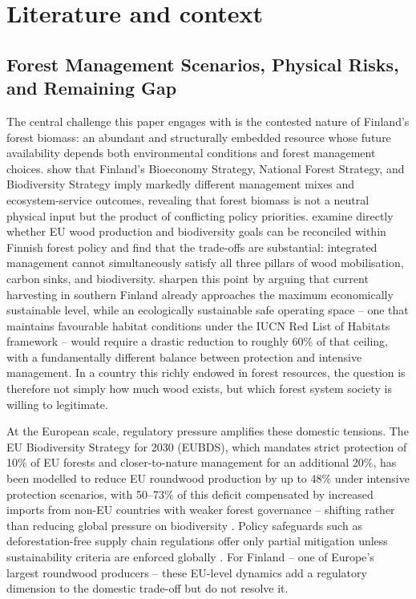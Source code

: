 \documentclass{article}
\begin{document}
\section{Literature and context}
\label{sec:lit_context}

\subsection{Forest Management Scenarios, Physical Risks, and Remaining Gap}

The central challenge this paper engages with is the contested nature of Finland's forest biomass: an abundant and structurally embedded resource whose future availability depends both environmental conditions and forest management choices. \citet{blattertSectoralPoliciesCause2022} show that Finland's Bioeconomy Strategy, National Forest Strategy, and Biodiversity Strategy imply markedly different management mixes and ecosystem-service outcomes, revealing that forest biomass is not a neutral physical input but the product of conflicting policy priorities. \citet{ratyEUWoodProduction2023} examine directly whether EU wood production and biodiversity goals can be reconciled within Finnish forest policy and find that the trade-offs are substantial: integrated management cannot simultaneously satisfy all three pillars of wood mobilisation, carbon sinks, and biodiversity. \citet{monkkonenEcologicallyEconomicallySustainable2024} sharpen this point by arguing that current harvesting in southern Finland already approaches the maximum economically sustainable level, while an ecologically sustainable safe operating space -- one that maintains favourable habitat conditions under the IUCN Red List of Habitats framework -- would require a drastic reduction to roughly 60\% of that ceiling, with a fundamentally different balance between protection and intensive management. In a country this richly endowed in forest resources, the question is therefore not simply how much wood exists, but which forest system society is willing to legitimate.

At the European scale, regulatory pressure amplifies these domestic tensions. The EU Biodiversity Strategy for 2030 (EUBDS), which mandates strict protection of 10\% of EU forests and closer-to-nature management for an additional 20\%, has been modelled to reduce EU roundwood production by up to 48\% under intensive protection scenarios, with 50--73\% of this deficit compensated by increased imports from non-EU countries with weaker forest governance -- shifting rather than reducing global pressure on biodiversity \citep{fischerLeakageBiodiversityRisks2024,schierAssessmentPossibleProduction2022,kallioPotentialImpactsEUs2025,rosaCanForestManagement2023}. Policy safeguards such as deforestation-free supply chain regulations offer only partial mitigation unless sustainability criteria are enforced globally \citep{fischerLeakageBiodiversityRisks2024,zamaniDeforestationfreeTradeImpact2026}. For Finland -- one of Europe's largest roundwood producers -- these EU-level dynamics add a regulatory dimension to the domestic trade-off but do not resolve it.
\end{document}
